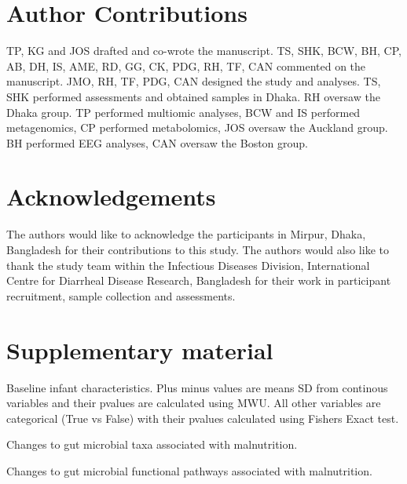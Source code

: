 \documentclass{article}
\begin{document}
\section*{Author Contributions}
TP, KG and JOS drafted and co-wrote the manuscript.
TS, SHK, BCW, BH, CP, AB, DH, IS, AME, RD, GG, CK, PDG, RH, TF, CAN commented on the manuscript.
JMO, RH, TF, PDG, CAN designed the study and analyses.
TS, SHK performed assessments and obtained samples in Dhaka.
RH oversaw the Dhaka group.
TP performed multiomic analyses, BCW and IS performed metagenomics, CP performed metabolomics, JOS oversaw the Auckland group.
BH performed EEG analyses, CAN oversaw the Boston group.

\section*{Acknowledgements}
The authors would like to acknowledge the participants in Mirpur, Dhaka, Bangladesh for their contributions to this study.
The authors would also like to thank the study team within the Infectious Diseases Division, International Centre for Diarrheal Disease Research, Bangladesh for their work in participant recruitment, sample collection and assessments.



\section*{Supplementary material}

\begin{table}[!htb]
\centering
\caption[Baseline infant characteristics]{
	Baseline infant characteristics.
	Plus minus values are means \textpm{} SD from continous variables and their pvalues are calculated using \gls{MWU}.
	All other variables are categorical (True vs False) with their pvalues calculated using Fishers Exact test.}
%
\label{TableS1}
\end{table}

\begin{table}[!htb]
\centering
\caption[Changes to gut microbial taxa associated with malnutrition]{
	Changes to gut microbial taxa associated with malnutrition.}
%
\label{TableS3}
\end{table}

\begin{table}[!htb]
\centering
\caption[Changes to gut microbial functional pathways associated with malnutrition]{
	Changes to gut microbial functional pathways associated with malnutrition.}
%
\label{TableS4}
\end{table}
\end{document}
